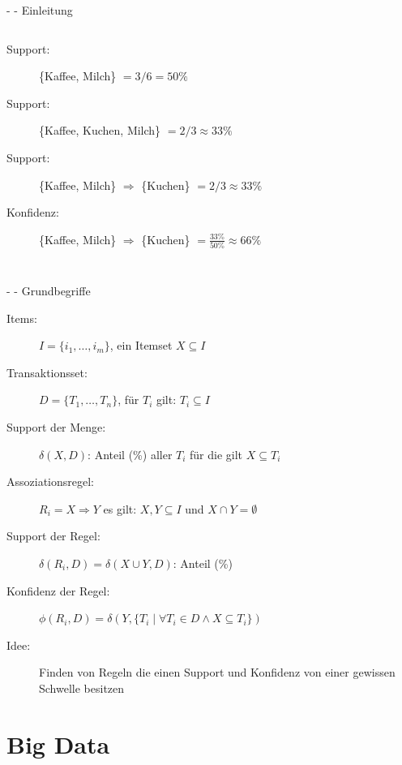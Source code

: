 \documentclass[fleqn,11pt,aspectratio=43]{beamer}
\begin{document}
\begin{frame}{\insertsectionhead - \insertsubsectionhead - Einleitung \cite{ester2000knowledge}}
\begin{columns}[onlytextwidth]
    \vspace{-1.2em}
	   \begin{description}
		   \item[Support:] \{Kaffee, Milch\} $= 3 / 6 = 50\%$
		   \item[Support:] \{Kaffee, Kuchen, Milch\} $= 2 / 3 \approx 33\%$
		   \item[Support:] \{Kaffee, Milch\} $\Rightarrow$ \{Kuchen\}  $= 2 / 3 \approx 33\%$
		   \item[Konfidenz:] \{Kaffee, Milch\} $\Rightarrow$ \{Kuchen\} $= \frac{33\%}{50\%} \approx 66\%$
	   \end{description}
\end{columns}
\end{frame}

\begin{frame}{\insertsectionhead - \insertsubsectionhead - Grundbegriffe \cite{ester2000knowledge}}
\begin{description}
\item[Items:] $I = \{i_1, \ldots, i_m\}$, ein Itemset $X \subseteq I$
\item[Transaktionsset:] $D = \{T_1, \ldots, T_n\}$, für $T_i$ gilt: $T_i \subseteq I$
\item[Support der Menge:] $\delta(X,D)$: Anteil (\%) aller $T_i$ für die gilt $X \subseteq T_i$
\item[Assoziationsregel:] $R_i = X \Rightarrow Y$ es gilt: $X, Y \subseteq I$ und $X \cap Y = \emptyset$ 
\item[Support der Regel:] $\delta(R_i, D) = \delta(X \cup Y, D)$: Anteil (\%)
\item[Konfidenz der Regel:] $\phi(R_i, D) = \delta(Y, \{T_i\;|\;\forall T_i \in D \wedge X \subseteq T_i\})$
\item[Idee:] Finden von Regeln die einen Support und Konfidenz von einer gewissen Schwelle besitzen
\end{description}
\end{frame}
		

\section{Big Data~}
\end{document}
